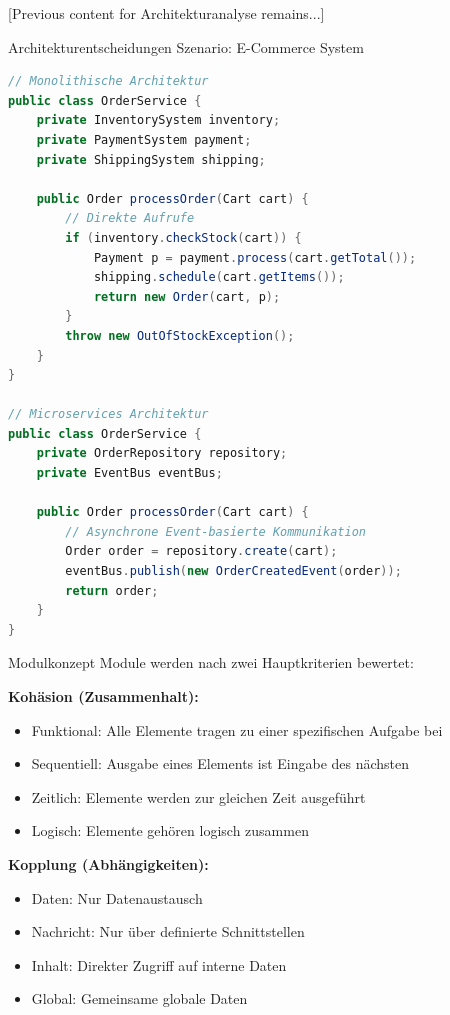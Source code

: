 [Previous content for Architekturanalyse remains...]

\begin{example}{Architekturentscheidungen}
Szenario: E-Commerce System
\begin{lstlisting}[language=Java]
// Monolithische Architektur
public class OrderService {
    private InventorySystem inventory;
    private PaymentSystem payment;
    private ShippingSystem shipping;
    
    public Order processOrder(Cart cart) {
        // Direkte Aufrufe
        if (inventory.checkStock(cart)) {
            Payment p = payment.process(cart.getTotal());
            shipping.schedule(cart.getItems());
            return new Order(cart, p);
        }
        throw new OutOfStockException();
    }
}

// Microservices Architektur
public class OrderService {
    private OrderRepository repository;
    private EventBus eventBus;
    
    public Order processOrder(Cart cart) {
        // Asynchrone Event-basierte Kommunikation
        Order order = repository.create(cart);
        eventBus.publish(new OrderCreatedEvent(order));
        return order;
    }
}
\end{lstlisting}
\end{example}

\begin{concept}{Modulkonzept}
Module werden nach zwei Hauptkriterien bewertet:

\textbf{Kohäsion (Zusammenhalt):}
\begin{itemize}
    \item Funktional: Alle Elemente tragen zu einer spezifischen Aufgabe bei
    \item Sequentiell: Ausgabe eines Elements ist Eingabe des nächsten
    \item Zeitlich: Elemente werden zur gleichen Zeit ausgeführt
    \item Logisch: Elemente gehören logisch zusammen
\end{itemize}

\textbf{Kopplung (Abhängigkeiten):}
\begin{itemize}
    \item Daten: Nur Datenaustausch
    \item Nachricht: Nur über definierte Schnittstellen
    \item Inhalt: Direkter Zugriff auf interne Daten
    \item Global: Gemeinsame globale Daten
\end{itemize}
\end{concept}

